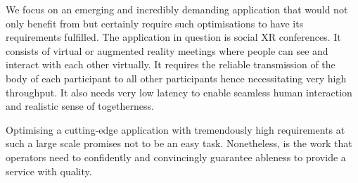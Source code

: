 We focus on an emerging and incredibly demanding application that would not only benefit from but certainly require such optimisations to have its requirements fulfilled. The application in question is social \ac{XR} conferences. It consists of virtual or augmented reality meetings where people can see and interact with each other virtually. It requires the reliable transmission of the body of each participant to all other participants hence necessitating very high throughput. It also needs very low latency to enable seamless human interaction and realistic sense of togetherness.

Optimising a cutting-edge application with tremendously high requirements at such a large scale promises not to be an easy task. Nonetheless, is the work that operators need to confidently and convincingly guarantee ableness to provide a service with quality.




